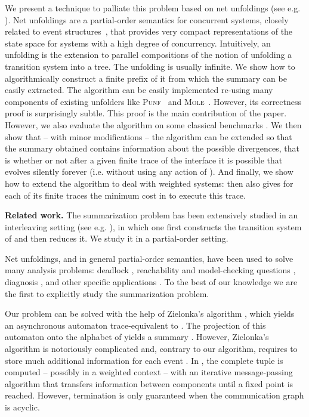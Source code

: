 \documentclass{llncs}
\begin{document}
We present a technique to palliate this problem based on 
net unfoldings (see e.g. \cite{Esparza08}). Net unfoldings are a partial-order semantics for 
concurrent systems, closely related to event structures~\cite{Winskel11}, that provides very 
compact representations of the state space for systems with a high degree of concurrency. 
Intuitively, an unfolding is the extension to parallel compositions
of the notion of unfolding a transition system into a tree. The unfolding
is usually infinite. We show how to algorithmically construct a finite 
prefix of it from which the summary can be easily extracted. The algorithm 
can be easily implemented re-using many 
components of existing unfolders like \textsc{Punf}~\cite{Punf}
and \textsc{Mole}~\cite{Mole}.
However, its correctness proof is surprisingly subtle. This proof is 
the main contribution of the paper. 
However, we also evaluate the algorithm on some classical benchmarks \cite{Cor96}.
We then show that -- with minor modifications -- the algorithm can be extended so that the summary obtained contains information about the possible divergences, that is whether or not after a given finite trace of the interface  it is possible that  evolves silently forever (i.e. without using any action of ).
And finally, we show how to extend the algorithm to deal with weighted systems:  then also gives for each of its finite traces the minimum cost in  to execute this trace.

{\bf Related work.} The summarization problem has been extensively studied in an 
interleaving setting (see e.g. \cite{GrafS90,Valmari96,zaraket2005scalable}), in which one 
first constructs the transition system of  and then reduces it. 
We study it in a partial-order setting.

Net unfoldings, and in general partial-order semantics, have been used to solve many analysis problems: deadlock \cite{Mcmillan95,Khomenko00}, 
reachability and model-checking questions \cite{Esparza96,Couvreur00,Khomenko03b,Esparza08,Baldan12}, diagnosis 
\cite{Fabre05}, and other specific applications \cite{Khomenko06,Hickmott07}. To the best of our knowledge 
we are the first to explicitly study the summarization problem. 

Our problem can be solved with the help of Zielonka's algorithm \cite{Zielonka87,Mukund94,Genest10}, which yields 
an asynchronous automaton trace-equivalent to . The projection of this automaton onto the alphabet of  
yields a summary . However, Zielonka's algorithm is notoriously complicated and, contrary to our algorithm, 
requires to store much additional information for each event \cite{Mukund94}. 
In \cite{Fabre09},  the complete tuple  is computed -- possibly in a weighted context -- with an iterative message-passing algorithm that 
transfers information between components until a fixed point is reached. However, termination
is only guaranteed when the communication graph is acyclic.
\end{document}
